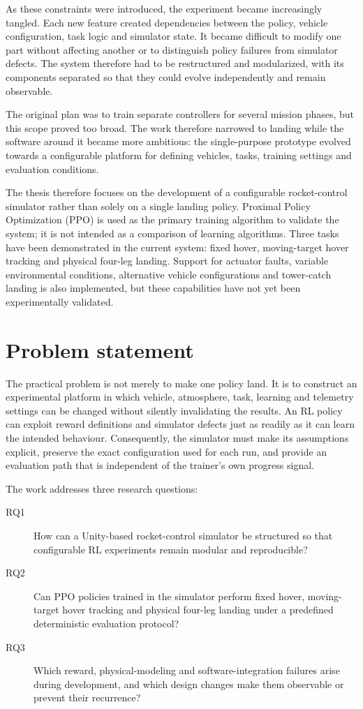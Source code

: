 As these constraints were introduced, the experiment became increasingly tangled. Each new feature created dependencies between the policy, vehicle configuration, task logic and simulator state. It became difficult to modify one part without affecting another or to distinguish policy failures from simulator defects. The system therefore had to be restructured and modularized, with its components separated so that they could evolve independently and remain observable.

The original plan was to train separate controllers for several mission phases, but this scope proved too broad. The work therefore narrowed to landing while the software around it became more ambitious: the single-purpose prototype evolved towards a configurable platform for defining vehicles, tasks, training settings and evaluation conditions.

The thesis therefore focuses on the development of a configurable rocket-control simulator rather than solely on a single landing policy. Proximal Policy Optimization (PPO) is used as the primary training algorithm to validate the system; it is not intended as a comparison of learning algorithms. Three tasks have been demonstrated in the current system: fixed hover, moving-target hover tracking and physical four-leg landing. Support for actuator faults, variable environmental conditions, alternative vehicle configurations and tower-catch landing is also implemented, but these capabilities have not yet been experimentally validated.

\section{Problem statement}

The practical problem is not merely to make one policy land. It is to construct an experimental platform in which vehicle, atmosphere, task, learning and telemetry settings can be changed without silently invalidating the results. An RL policy can exploit reward definitions and simulator defects just as readily as it can learn the intended behaviour. Consequently, the simulator must make its assumptions explicit, preserve the exact configuration used for each run, and provide an evaluation path that is independent of the trainer's own progress signal.

The work addresses three research questions:

\begin{description}
	\item[RQ1] How can a Unity-based rocket-control simulator be structured so that configurable
	RL experiments remain modular and reproducible?
	\item[RQ2] Can PPO policies trained in the simulator perform fixed hover, moving-target hover
	tracking and physical four-leg landing under a predefined deterministic evaluation protocol?
	\item[RQ3] Which reward, physical-modeling and software-integration failures arise during
	development, and which design changes make them observable or prevent their recurrence?
\end{description}

